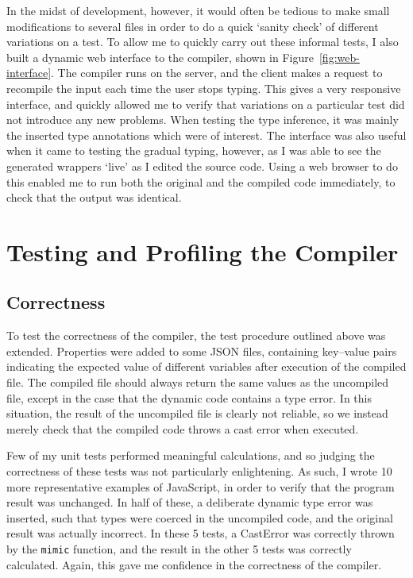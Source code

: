 \documentclass[12pt,a4paper,twoside,openright]{report}
\theoremstyle{definition}
\theoremstyle{dotless}
\begin{document}
In the midst of development, however, it would often be tedious to make small
modifications to several files in order to do a quick `sanity check' of
different variations on a test. To allow me to quickly carry out these informal
tests, I also built a dynamic web interface to the compiler, shown in
Figure~\ref{fig:web-interface}.  The compiler runs on the server, and the
client makes a request to recompile the input each time the user stops typing.
This gives a very responsive interface, and quickly allowed me to verify that
variations on a particular test did not introduce any new problems. When
testing the type inference, it was mainly the inserted type annotations which
were of interest. The interface was also useful when it came to testing the
gradual typing, however, as I was able to see the generated wrappers `live' as
I edited the source code. Using a web browser to do this enabled me to run both
the original and the compiled code immediately, to check that the output was
identical.

\section{Testing and Profiling the Compiler}

\subsection*{Correctness}

To test the correctness of the compiler, the test procedure outlined above was
extended. Properties were added to some JSON files, containing
key--value pairs indicating the expected value of different variables after
execution of the compiled file. The compiled file should always return the same
values as the uncompiled file, except in the case that the dynamic code
contains a type error. In this situation, the result of
the uncompiled file is clearly not reliable, so we instead merely check that the
compiled code throws a cast error when executed.

Few of my unit tests performed meaningful calculations, and so judging the
correctness of these tests was not particularly enlightening. As such, I wrote
10 more representative examples of JavaScript, in order to verify that the
program result was unchanged. In half of these, a deliberate dynamic type error
was inserted, such that types were coerced in the uncompiled code, and the
original result was actually incorrect. In these 5 tests, a CastError was
correctly thrown by the \texttt{mimic} function, and the result in the other 5
tests was correctly calculated. Again, this gave me confidence in the correctness
of the compiler.
\end{document}
